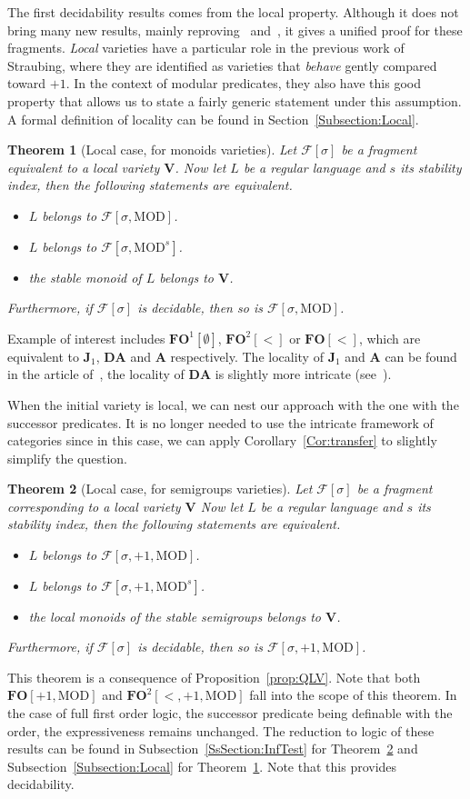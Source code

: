 \documentclass[submission,hidelink]{dmtcs-episciences}
\newtheorem{theorem}{Theorem}
\newcommand{\A}{\mathbf{A}}
\newcommand{\DA}{\mathbf{DA}}
\newcommand{\V}{\mathbf{V}}
\newcommand{\J}{\mathbf{J}}
\newcommand{\cF}{\mathcal{F}}
\newcommand{\FO}{\mathbf{FO}}
\newcommand{\MOD}{\mathrm{MOD}}
\begin{document}
 
The first decidability results comes from the local property.
Although it does not bring many new results, mainly reproving~\cite{Bar92} and~\cite{DP13}, it gives a unified proof for these fragments.
\emph{Local} varieties have a particular role in the previous work of Straubing, where they are identified as varieties that \emph{behave}
gently compared toward $+1$. In the context of modular predicates, they also have this good property that allows us to state a
fairly generic statement under this assumption. A formal definition of locality can be found in Section~\ref{Subsection:Local}.
\begin{theorem}[Local case, for monoids varieties]\label{Main:local}
	Let $\cF[\sigma]$ be a fragment equivalent to a local variety $\V$.
Now let $L$ be a regular language and $s$ its stability index, then the following statements are equivalent.
\begin{itemize}
	\item  $L$ belongs to $\cF[\sigma,\MOD]$.
	\item  $L$ belongs to $\cF[\sigma,\MOD^s]$.
	\item  the stable monoid of $L$ belongs to $\V$.
\end{itemize}
Furthermore, if $\cF[\sigma]$ is decidable, then so is $\cF[\sigma,\MOD]$.
\end{theorem}
Example of interest includes  $\FO^1[\emptyset]$, ${\FO^2[<]}$ or $\FO[<]$, which are equivalent to $\J_1$, $\DA$ and $\A$ respectively.
The locality of $\J_1$ and $\A$ can be found in the article of~\cite{Tilson}, the locality of $\DA$ is slightly more intricate (see~\cite{Almeida96}).


When the initial variety is local, we can nest our approach with the one with the successor predicates. It is no longer needed to
use the intricate framework of categories since in this case, we can apply Corollary~\ref{Cor:transfer} to slightly simplify the question.
\begin{theorem}[Local case, for semigroups varieties]\label{Main:local2}
Let $\cF[\sigma]$ be a fragment corresponding to a local variety $\V$
Now let $L$ be a regular language and $s$ its stability index, then the following statements are equivalent.
\begin{itemize}
	\item  $L$ belongs to $\cF[\sigma,+1, \MOD]$.
	\item  $L$ belongs to $\cF[\sigma,+1, \MOD^s]$.
	\item  the local monoids of the stable semigroups belongs to $\V$.
\end{itemize}
Furthermore, if $\cF[\sigma]$ is decidable, then so is $\cF[\sigma,+1,\MOD]$.
\end{theorem}
This theorem is a consequence of Proposition~\ref{prop:QLV}.
Note that both $\FO[+1,\MOD]$ and $\FO^2[<,+1,\MOD]$ fall into the scope of this theorem. In the case of full first order
logic, the successor predicate being definable with the order, the expressiveness remains unchanged. The reduction to logic of these results can be found in Subsection~\ref{SsSection:InfTest} for Theorem~\ref{Main:local2} and Subsection~\ref{Subsection:Local} for Theorem~\ref{Main:local}. Note that this provides decidability.
\end{document}
